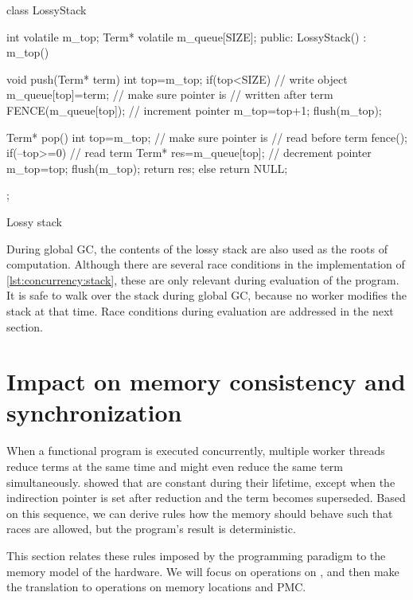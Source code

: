 \begin{lstcols}{2}%
\begin{lstcode}[
	variable={m_top,m_queue,term,top,res},
	type={LossyStack,Term},
	constant={SIZE},
]
class LossyStack {
	int volatile m_top;
	Term* volatile m_queue[SIZE];
public:
	LossyStack() : m_top() {}

	void push(Term* term){
		int top=m_top;
		if(top<SIZE){
			// write object
			m_queue[top]=term;$\label{l:stack_object}$
			// make sure pointer is
			//  written after term
			FENCE(m_queue[top]);
			// increment pointer
			m_top=top+1;
			flush(m_top);
		}
	}

	Term* pop(){
		int top=m_top;
		// make sure pointer is
		//  read before term
		fence();
		if(--top>=0){
			// read term
			Term* res=m_queue[top];
			// decrement pointer
			m_top=top;
			flush(m_top);
			return res;
		}else
			return NULL;
	}

};
\end{lstcode}%
\caption{Lossy stack}%
\label{lst:concurrency:stack}%
\end{lstcols}

During global \ac{GC}, the contents of the lossy stack are also used as the roots of computation.
Although there are several race conditions in the implementation of \vref{lst:concurrency:stack}, these are only relevant during evaluation of the program.
It is safe to walk over the stack during global \ac{GC}, because no worker modifies the stack at that time.
Race conditions during evaluation are addressed in the next section.


\section{Impact on memory consistency and synchronization}
\label{s:concurrency:memory}

When a functional program is executed concurrently, multiple worker threads reduce terms at the same time and might even reduce the same term simultaneously.
 showed that \lterms are constant during their lifetime, except when the indirection pointer is set after reduction and the term becomes superseded.
Based on this sequence, we can derive rules how the memory should behave such that races are allowed, but the program's result is deterministic.

This section relates these rules imposed by the programming paradigm to the memory model of the hardware.
We will focus on operations on \lterms, and then make the translation to operations on memory locations and \ac{PMC}.

